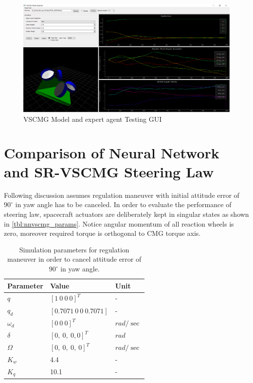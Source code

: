 \begin{figure}[H]
    \centering
    \includegraphics[width=\textwidth]{figures/AI/ModelExplorer1.pdf}
    \caption{VSCMG Model and expert agent Testing GUI}
    \label{fig:model_explorer}
\end{figure}


\section{Comparison of Neural Network and SR-VSCMG Steering Law}
Following discussion assumes regulation maneuver with initial attitude error of $90^\circ$ in yaw angle has to be canceled. In order to evaluate the performance of steering law, spacecraft actuators are deliberately kept in singular states as shown in  \autoref{tbl:nnvscmg_params}. Notice angular momentum of all reaction wheels is zero, moreover required torque is orthogonal to CMG torque axis. 
\begin{table}[ht]
        \centering
\begin{tabular}{|p{}|p{}|p{}|}
\hline 
 Parameter & Value & Unit \\
\hline 
 $\displaystyle q$ & $\displaystyle [ 1\ 0\ 0\ 0]^{T}$ & - \\
\hline 
 $\displaystyle q_{d}$ & $\displaystyle [ 0.7071\ 0\ 0\ 0.7071]$ & - \\
\hline 
 $\displaystyle \omega _{d}$ & $\displaystyle [ 0\ 0\ 0]^{T}$ & $\displaystyle rad/\sec$ \\
\hline 
 $\displaystyle \delta $ & $\displaystyle [ 0,\ 0,\ 0,0]^{T}$ & $\displaystyle rad$ \\
\hline 
 $\displaystyle \Omega $ & $\displaystyle [ 0,\ 0,\ 0,\ 0]^{T}$ & $\displaystyle rad/\sec$ \\
\hline 
 $\displaystyle K_{w}$ & 4.4 & - \\
\hline 
 $\displaystyle K_{q}$ & 10.1 & - \\
 \hline
\end{tabular}
        \caption{Simulation parameters for regulation maneuver in order to cancel attitude error of $\displaystyle 90^{\circ }$ in yaw angle.}
        \label{tbl:nnvscmg_params}
        \end{table}
        
